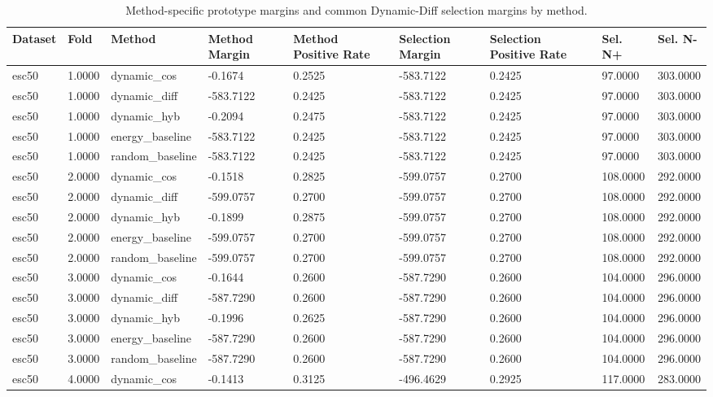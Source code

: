 \begin{table}[htbp]
\centering
\caption{Method-specific prototype margins and common Dynamic-Diff selection margins by method.}
\label{tab:dynamic-fpde-margin-summary}
\begin{tabular}{lllllllll}
\toprule
Dataset & Fold & Method & Method Margin & Method Positive Rate & Selection Margin & Selection Positive Rate & Sel. N+ & Sel. N- \\
\midrule
esc50 & 1.0000 & dynamic\_cos & -0.1674 & 0.2525 & -583.7122 & 0.2425 & 97.0000 & 303.0000 \\
esc50 & 1.0000 & dynamic\_diff & -583.7122 & 0.2425 & -583.7122 & 0.2425 & 97.0000 & 303.0000 \\
esc50 & 1.0000 & dynamic\_hyb & -0.2094 & 0.2475 & -583.7122 & 0.2425 & 97.0000 & 303.0000 \\
esc50 & 1.0000 & energy\_baseline & -583.7122 & 0.2425 & -583.7122 & 0.2425 & 97.0000 & 303.0000 \\
esc50 & 1.0000 & random\_baseline & -583.7122 & 0.2425 & -583.7122 & 0.2425 & 97.0000 & 303.0000 \\
esc50 & 2.0000 & dynamic\_cos & -0.1518 & 0.2825 & -599.0757 & 0.2700 & 108.0000 & 292.0000 \\
esc50 & 2.0000 & dynamic\_diff & -599.0757 & 0.2700 & -599.0757 & 0.2700 & 108.0000 & 292.0000 \\
esc50 & 2.0000 & dynamic\_hyb & -0.1899 & 0.2875 & -599.0757 & 0.2700 & 108.0000 & 292.0000 \\
esc50 & 2.0000 & energy\_baseline & -599.0757 & 0.2700 & -599.0757 & 0.2700 & 108.0000 & 292.0000 \\
esc50 & 2.0000 & random\_baseline & -599.0757 & 0.2700 & -599.0757 & 0.2700 & 108.0000 & 292.0000 \\
esc50 & 3.0000 & dynamic\_cos & -0.1644 & 0.2600 & -587.7290 & 0.2600 & 104.0000 & 296.0000 \\
esc50 & 3.0000 & dynamic\_diff & -587.7290 & 0.2600 & -587.7290 & 0.2600 & 104.0000 & 296.0000 \\
esc50 & 3.0000 & dynamic\_hyb & -0.1996 & 0.2625 & -587.7290 & 0.2600 & 104.0000 & 296.0000 \\
esc50 & 3.0000 & energy\_baseline & -587.7290 & 0.2600 & -587.7290 & 0.2600 & 104.0000 & 296.0000 \\
esc50 & 3.0000 & random\_baseline & -587.7290 & 0.2600 & -587.7290 & 0.2600 & 104.0000 & 296.0000 \\
esc50 & 4.0000 & dynamic\_cos & -0.1413 & 0.3125 & -496.4629 & 0.2925 & 117.0000 & 283.0000 \\

\end{tabular}
\end{table}
